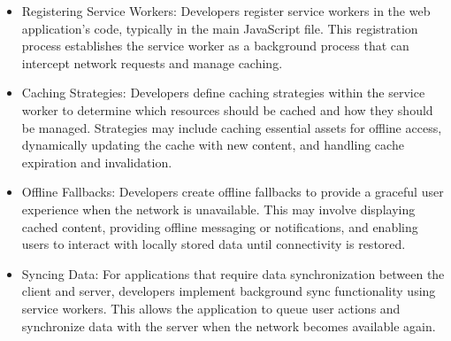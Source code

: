 \documentclass[12pt,a4paper, twosite]{article}
\begin{document}
\begin{itemize}
  \item Registering Service Workers: Developers register service workers in the web application's code, typically in the main JavaScript file. This registration process establishes the service worker as a background process that can intercept network requests and manage caching.

  \item Caching Strategies: Developers define caching strategies within the service worker to determine which resources should be cached and how they should be managed. Strategies may include caching essential assets for offline access, dynamically updating the cache with new content, and handling cache expiration and invalidation.

  \item Offline Fallbacks: Developers create offline fallbacks to provide a graceful user experience when the network is unavailable. This may involve displaying cached content, providing offline messaging or notifications, and enabling users to interact with locally stored data until connectivity is restored.

  \item Syncing Data: For applications that require data synchronization between the client and server, developers implement background sync functionality using service workers. This allows the application to queue user actions and synchronize data with the server when the network becomes available again.
\end{itemize}
\end{document}
